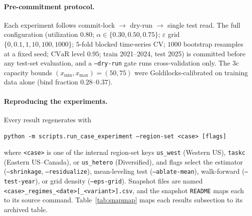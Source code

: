 \documentclass[12pt]{article}
\newcommand{\CVaR}{\mathrm{CVaR}}
\begin{document}
\paragraph{Pre-commitment protocol.} Each experiment follows commit-lock
$\rightarrow$ dry-run $\rightarrow$ single test read. The full configuration
(utilization $0.80$; $\alpha\in\{0.30,0.50,0.75\}$; $\varepsilon$ grid
$\{0,0.1,1,10,100,1000\}$; $5$-fold blocked time-series CV; $1000$ bootstrap
resamples at a fixed seed; $\CVaR$ level $0.95$; train 2021--2024, test 2025) is
committed before any test-set evaluation, and a \texttt{--dry-run} gate runs
cross-validation only. The 3c capacity bounds $(x_{\min},x_{\max})=(50,75)$ were
Goldilocks-calibrated on training data alone (bind fraction $0.28$--$0.37$).

\paragraph{Reproducing the experiments.} Every result regenerates with
\begin{center}
\texttt{python -m scripts.run\_case\_experiment --region-set <case> [flags]}
\end{center}
where \texttt{<case>} is one of the internal region-set keys \texttt{us\_west}
(Western US), \texttt{taskc} (Eastern US--Canada), or \texttt{us\_hetero}
(Diversified), and flags select the estimator (\texttt{--shrinkage},
\texttt{--residualize}), mean-leveling test (\texttt{--ablate-mean}), walk-forward
(\texttt{--test-year}), or grid density (\texttt{--eps-grid}). Snapshot files are
named \texttt{<case>\_regimes\_<date>[\_<variant>].csv}, and the snapshot
\texttt{README} maps each to its source command.
Table~\ref{tab:snapmap} maps each results subsection to its archived table.
\end{document}
